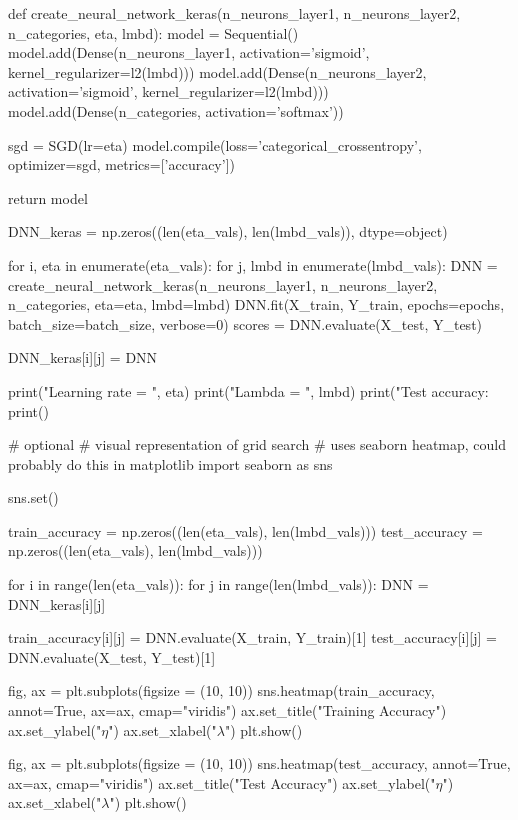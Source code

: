 \documentclass[%
oneside,                 %
final,                   %
10pt]{article}
\begin{document}
def create_neural_network_keras(n_neurons_layer1, n_neurons_layer2, n_categories, eta, lmbd):
    model = Sequential()
    model.add(Dense(n_neurons_layer1, activation='sigmoid', kernel_regularizer=l2(lmbd)))
    model.add(Dense(n_neurons_layer2, activation='sigmoid', kernel_regularizer=l2(lmbd)))
    model.add(Dense(n_categories, activation='softmax'))
    
    sgd = SGD(lr=eta)
    model.compile(loss='categorical_crossentropy', optimizer=sgd, metrics=['accuracy'])
    
    return model
\epycod

\bpycod
DNN_keras = np.zeros((len(eta_vals), len(lmbd_vals)), dtype=object)
        
for i, eta in enumerate(eta_vals):
    for j, lmbd in enumerate(lmbd_vals):
        DNN = create_neural_network_keras(n_neurons_layer1, n_neurons_layer2, n_categories,
                                         eta=eta, lmbd=lmbd)
        DNN.fit(X_train, Y_train, epochs=epochs, batch_size=batch_size, verbose=0)
        scores = DNN.evaluate(X_test, Y_test)
        
        DNN_keras[i][j] = DNN
        
        print("Learning rate = ", eta)
        print("Lambda = ", lmbd)
        print("Test accuracy: %
        print()
\epycod

\bpycod
# optional
# visual representation of grid search
# uses seaborn heatmap, could probably do this in matplotlib
import seaborn as sns

sns.set()

train_accuracy = np.zeros((len(eta_vals), len(lmbd_vals)))
test_accuracy = np.zeros((len(eta_vals), len(lmbd_vals)))

for i in range(len(eta_vals)):
    for j in range(len(lmbd_vals)):
        DNN = DNN_keras[i][j]

        train_accuracy[i][j] = DNN.evaluate(X_train, Y_train)[1]
        test_accuracy[i][j] = DNN.evaluate(X_test, Y_test)[1]

        
fig, ax = plt.subplots(figsize = (10, 10))
sns.heatmap(train_accuracy, annot=True, ax=ax, cmap="viridis")
ax.set_title("Training Accuracy")
ax.set_ylabel("$\eta$")
ax.set_xlabel("$\lambda$")
plt.show()

fig, ax = plt.subplots(figsize = (10, 10))
sns.heatmap(test_accuracy, annot=True, ax=ax, cmap="viridis")
ax.set_title("Test Accuracy")
ax.set_ylabel("$\eta$")
ax.set_xlabel("$\lambda$")
plt.show()
\epycod
\end{document}
